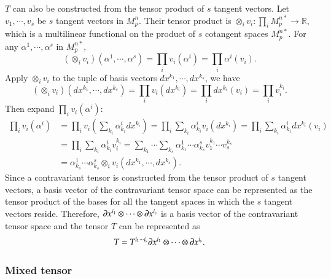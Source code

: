 \documentclass[11pt, a4paper]{book}
\begin{document}
$T$ can also be constructed from the tensor product of $s$ tangent vectors. Let
$v_1,\cdots,v_s$ be $s$ tangent vectors in $M_p^n$. Their tensor product is
$\otimes_i v_i: \prod_i M_p^{n*} \rightarrow \mathbb{R}$, which is a multilinear
functional on the product of $s$ cotangent spaces $M_p^{n*}$. For any
$\alpha^1,\cdots,\alpha^s$ in $M_p^{n*}$,
\begin{equation}
  \left( \otimes_i v_i \right)(\alpha^1,\cdots,\alpha^s) = \prod_i v_i(\alpha^i) = \prod_i
  \alpha^i(v_i).
\end{equation}
Apply $\otimes_iv_i$ to the tuple of basis vectors $dx^{k_1},\cdots,dx^{k_s}$, we have
\begin{equation}
  \left( \otimes_i v_i \right)(dx^{k_1},\cdots,dx^{k_s}) = \prod_i v_i(dx^{k_i}) = \prod_i
  dx^{k_i}(v_i) = \prod_i v_i^{k_i}.
\end{equation}
Then expand $\prod_i v_i(\alpha^i)$:
\begin{equation}
  \begin{aligned}
    \prod_i v_i(\alpha^i) &= \prod_i v_i \left( \sum_{k_i}\alpha_{k_i}^i dx^{k_i} \right)
    = \prod_i\sum_{k_i} \alpha_{k_i}^iv_i(dx^{k_i}) = \prod_i\sum_{k_i}\alpha_{k_i}^i
    dx^{k_i}(v_i) \\
    &= \prod_i\sum_{k_i} \alpha_{k_i}^i v_i^{k_i} =
    \sum_{k_1}\cdots\sum_{k_s}\alpha_{k_1}^1\cdots\alpha_{k_s}^s v_1^{k_1}\cdots v_s^{k_s} \\
    &= \alpha_{k_s}^1\cdots\alpha_{k_s}^s \otimes_iv_i(dx^{k_1},\cdots,dx^{k_s}).
  \end{aligned}
\end{equation}
Since a contravariant tensor is constructed from the tensor product of $s$ tangent
vectors, a basis vector of the contravariant tensor space can be represented as the tensor
product of the bases for all the tangent spaces in which the $s$ tangent vectors reside.
Therefore, $\boldsymbol{\partial}x^{i_1}\otimes\cdots\otimes \boldsymbol{\partial}x^{i_s}$ is a basis
vector of the contravariant tensor space and the tensor $T$ can be represented as
\begin{equation}
  \label{eq:contravariant-tensor-expanded-as-tensor-product}
  T = T^{i_1\cdots i_s} \boldsymbol{\partial}x^{i_1}\otimes\cdots\otimes \boldsymbol{\partial}x^{i_s}.
\end{equation}

\subsubsection{Mixed tensor}
\end{document}
